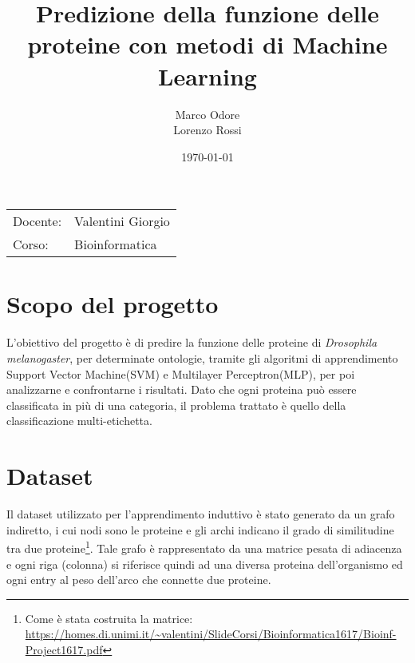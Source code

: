 \documentclass{article}
\title{Predizione della funzione delle proteine con
metodi di Machine Learning} %
\author{Marco Odore \\ Lorenzo Rossi} %
\date{\today} %
\begin{document}
\maketitle %

\begin{center}
\begin{tabular}{l l}

Docente: & Valentini Giorgio \\%
Corso: & Bioinformatica
\end{tabular}
\end{center}



\section{Scopo del progetto}

L'obiettivo del progetto è di predire la funzione delle proteine di \emph{Drosophila
melanogaster}, per determinate ontologie, tramite gli algoritmi di apprendimento Support Vector Machine(SVM) e Multilayer Perceptron(MLP), per poi analizzarne e confrontarne i risultati. Dato che ogni proteina può essere classificata in più di una categoria, il problema trattato è quello della classificazione multi-etichetta.

\section{Dataset}
Il dataset utilizzato per l'apprendimento induttivo è stato generato da un grafo indiretto, i cui nodi sono le proteine e gli archi indicano il grado di similitudine tra due proteine\footnote{Come è stata costruita la matrice:\\ \url{https://homes.di.unimi.it/~valentini/SlideCorsi/Bioinformatica1617/Bioinf-Project1617.pdf}}. Tale grafo è rappresentato da una matrice pesata  di  adiacenza e ogni  riga  (colonna)  si  riferisce quindi  ad  una  diversa  proteina  dell'organismo  ed  ogni  entry  al  peso  dell'arco che connette due proteine.
\end{document}
